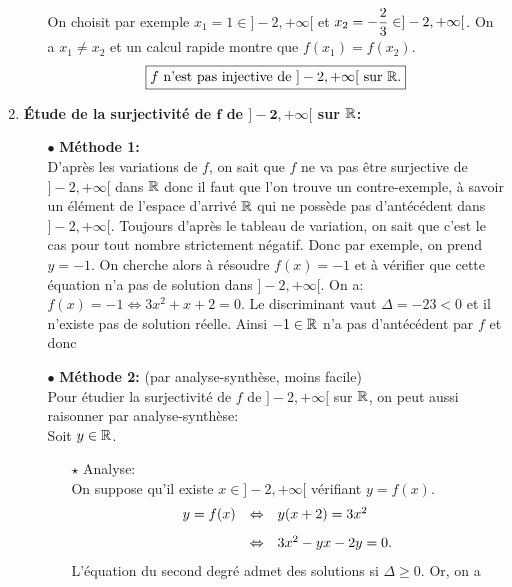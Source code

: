 \documentclass[a4paper, 11pt,reqno]{article}
\begin{document}
\begin{correction}
\begin{enumerate}
\begin{itemize}
				      \noindent On choisit par exemple $x_1=1\in\rbrack -2,+\infty\lbrack$ et $x_2=-\displaystyle\frac{2}{3}\in\rbrack -2,+\infty\lbrack$. On a $x_1\not= x_2$ et un calcul rapide montre que $f(x_1)=f(x_2)$.
				      $$\fbox{$ f\ \hbox{n'est pas injective de}\ \rbrack -2,+\infty\lbrack\ \hbox{sur}\ \R. $}$$
		      \end{itemize}
		\item  \textbf{\'Etude de la surjectivit\'e de $\mathbf{f}$ de $\mathbf{\rbrack -2,+\infty\lbrack}$ sur $\mathbf{\mathbb{R}}$:}
		      \begin{itemize}
			      \item[$\bullet$] \textbf{M\'ethode 1:} \\
				      \noindent D'apr\`{e}s les variations de $f$, on sait que $f$ ne va pas \^{e}tre surjective de $\rbrack -2,+\infty\lbrack$ dans $\mathbb{R}$ donc il faut que l'on trouve un contre-exemple, \`{a} savoir un \'el\'ement de l'espace d'arriv\'e $\mathbb{R}$ qui ne poss\`{e}de pas d'ant\'ec\'edent dans $\rbrack -2,+\infty\lbrack$. Toujours d'apr\`{e}s le tableau de variation, on sait que c'est le cas pour tout nombre strictement n\'egatif. Donc par exemple, on prend $y=-1$. On cherche alors \`{a} r\'esoudre $f(x)=-1$ et \`{a} v\'erifier que cette \'equation n'a pas de solution dans $\rbrack -2,+\infty\lbrack$. On a: $f(x)=-1\Leftrightarrow 3x^2+x+2=0$. Le discriminant vaut $\Delta=-23<0$ et il n'existe pas de solution r\'eelle. Ainsi $-1\in \mathbb{R}$ n'a pas d'ant\'ec\'edent par $f$ et donc 
			      \item[$\bullet$] \textbf{M\'ethode 2:} (par analyse-synth\`ese, moins facile)\\
				      \noindent Pour \'etudier la surjectivit\'e de $f$ de $\rbrack -2,+\infty\lbrack$ sur $\mathbb{R}$, on peut aussi raisonner par analyse-synth\`ese:\\
				      \noindent Soit $y\in\mathbb{R}$.
				      \begin{itemize}
					      \item[$\star$]Analyse:\\
					      \noindent On suppose qu'il existe $x\in\rbrack -2,+\infty\lbrack$ v\'erifiant $y=f(x)$.
					      $$\begin{array}{lll}
							      y=f(x) & \Leftrightarrow & y(x+2)=3x^2\vsec \\
							             & \Leftrightarrow & 3x^2-yx-2y=0.
						      \end{array}$$
					      L'\'equation du second degr\'e admet des solutions si $\Delta \geq 0$. Or, on a

\end{itemize}
\end{itemize}
\end{enumerate}
\end{correction}
\end{document}
